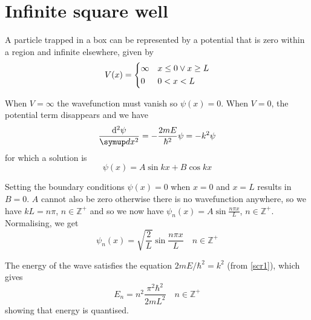 \section{Infinite square well}
A particle trapped in a box can be represented by a potential that is zero within a region and infinite elsewhere, given by \begin{equation*}V(x) = \begin{dcases} \infty &x \leq 0 \vee x \geq L\\0 &0 < x < L\end{dcases}\end{equation*}

When \(V = \infty\) the wavefunction must vanish so \(\psi(x) = 0\). When \(V = 0\), the potential term disappears and we have \begin{equation}\label{scr1}\frac{\mathrm{d}^2\psi}{\sld{x^2}} = -\frac{2mE}{\hbar^2}\psi = -k^2\psi\end{equation} for which a solution is \[\psi(x) = A\sin kx + B\cos kx\]

Setting the boundary conditions \(\psi(x) = 0\) when \(x = 0\) and \(x = L\) results in \(B = 0\). \(A\) cannot also be zero otherwise there is no wavefunction anywhere, so we have \(kL = n\pi\), \(n \in \mathbb{Z}^+\) and so we now have \(\psi_n(x) = A\sin\frac{n\pi x}{L}\), \(n\in\mathbb{Z}^+\). Normalising, we get \[\psi_n(x) = \sqrt{\frac{2}{L}}\sin\frac{n\pi x}{L}\quad n\in\mathbb{Z}^+\]

The energy of the wave satisfies the equation \(2mE/\hbar^2 = k^2\) (from \eqref{scr1}), which gives \[E_n = n^2\frac{\pi^2\hbar^2}{2mL^2}\quad n\in\mathbb{Z}^+\] showing that energy is quantised.
